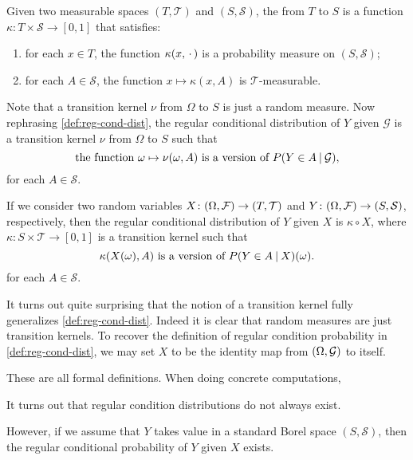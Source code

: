 \begin{defn}
    Given two measurable spaces $(T,\mathcal T)$ and $(S,\mathcal S)$, the  from $T$ to $S$ is a function $\kappa: T \times \mathcal S \to [0,1]$ that satisfies: \begin{enumerate}
    \item for each $x \in T$, the function $\kappa (x,\,\cdot\,)$ is a probability measure on $(S,\mathcal S)$;
    \item for each $A \in \mathcal S$, the function $x \mapsto \kappa (x,A)$ is $\mathcal T$-measurable.
\end{enumerate}
\end{defn}

Note that a transition kernel $\nu$ from $\Omega$ to $S$ is just a random measure. Now rephrasing \cref{def:reg-cond-dist}, the regular conditional distribution of $Y$ given $\mathcal G$ is a transition kernel $\nu$ from $\Omega$ to $S$ such that \begin{equation*}
    \text{the function }\omega \mapsto \nu(\omega,A) \text{ is a version of } P(Y \in A\mathbin{|} \mathcal{G}),
\end{equation*} for each $A \in \mathcal S$.

If we consider two random variables $X\colon (\Omega,\mathcal{F}) \to (T,\mathcal T)$ and $Y\colon (\Omega,\mathcal{F}) \to (S,\mathcal S)$, respectively, then the regular conditional distribution of $Y$ given $X$ is $\kappa \circ X$, where $\kappa \colon S \times \mathcal T \to [0,1]$ is a transition kernel such that \begin{equation}\kappa(X(\omega),A) \text{ is a version of } P(Y \in A \giv X) (\omega). \label{eq:transition-ker-to-rcd} \end{equation} for each $A \in \mathcal S$.

It turns out quite surprising that the notion of a transition kernel fully generalizes \cref{def:reg-cond-dist}. Indeed it is clear that random measures are just transition kernels. To recover the definition of regular condition probability in \cref{def:reg-cond-dist}, we may set $X$ to be the identity map from $(\Omega,\mathcal{G})$ to itself.

These are all formal definitions. When doing concrete computations, 

It turns out that regular condition distributions do not always exist. 

However, if we assume that $Y$ takes value in a standard Borel space $(S,\mathcal S)$, then the regular conditional probability of $Y$ given $X$ exists.

